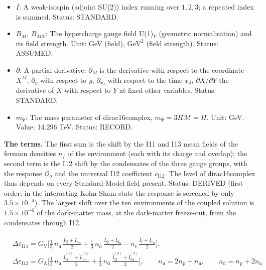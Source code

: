 \documentclass[
  10pt,
]{article}
\begin{document}
\begin{itemize}
  indices the components along the observable directions. Unit: GeV
  (field), \(\mathrm{GeV}^{2}\) (field strength). Status: ASSUMED.
\item
  \(I\): A weak-isospin (adjoint SU(2)) index running over \(1, 2, 3\);
  a repeated index is summed. Status: STANDARD.
\item
  \(B_M,\ B_{MN}\): The hypercharge gauge field U(1)\(_Y\) (geometric
  normalisation) and its field strength. Unit: GeV (field),
  \(\mathrm{GeV}^{2}\) (field strength). Status: ASSUMED.
\item
  \(\partial\): A partial derivative: \(\partial_M\) is the derivative
  with respect to the coordinate \(X^M\), \(\partial_y\) with respect to
  \(y\), \(\partial_{x_4}\) with respect to the time \(x_4\),
  \(\partial X/\partial Y\) the derivative of \(X\) with respect to
  \(Y\) at fixed other variables. Status: STANDARD.
\item
  \(m_\Psi\): The mass parameter of dirac16complex,
  \(m_\Psi = 3H\mathcal{M} = H\). Unit: GeV. Value: 14.296 TeV. Status:
  RECORD.
\end{itemize}

\textbf{The terms.} The first sum is the shift by the I11 and I13 mean
fields of the fermion densities \(n_f\) of the environment (each with
its charge and overlap); the second term is the I12 shift by the
condensates of the three gauge groups, with the response
\(\mathcal{O}_o\) and the universal I12 coefficient
\(c_{\mathrm{I12}}\). The level of dirac16complex thus depends on every
Standard-Model field present. Status: DERIVED (first order; in the
interacting Kohn-Sham state the response is screened by only
\(3.5\times10^{-4}\)). The largest shift over the ten environments of
the coupled solution is \(1.5\times10^{-6}\) of the dark-matter mass, at
the dark-matter freeze-out, from the condensates through I12.

\[
\begin{aligned}
&\Delta\varepsilon_{\mathrm{I11}} = G_{\mathrm{V}}\Big[\frac13\,n_{\mathrm{u}}\,\frac{\tilde I_Q +
 \tilde I_{u_R}}{2}
 + \frac13\,n_{\mathrm{d}}\,\frac{\tilde I_Q + \tilde I_{d_R}}{2} - n_{\mathrm{e}}\,\frac{\tilde I_\ell
 + \tilde I_{e_R}}{2}\Big],\\
&\Delta\varepsilon_{\mathrm{I13}} = G_{\mathrm{A}}\Big[\frac13\,n_{\mathrm{u}}\,\frac{\tilde I^{(b)}_Q +
 \tilde I^{(b)}_{u_R}}{2}
 + \frac13\,n_{\mathrm{d}}\,\frac{\tilde I^{(b)}_Q + \tilde I^{(b)}_{d_R}}{2}\Big],\qquad
 n_{\mathrm{u}} = 2n_{\mathrm{p}} + n_{\mathrm{n}},\qquad n_{\mathrm{d}} = n_{\mathrm{p}} + 2n_{\mathrm{n}}
\end{aligned} \tag{FE-73}
\]
\end{document}
